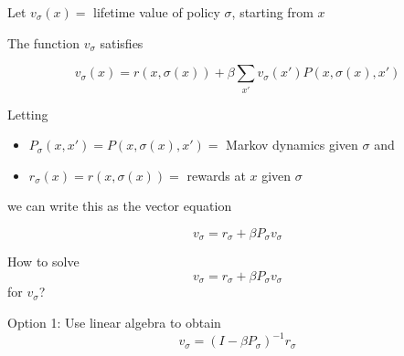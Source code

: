 \documentclass[xcolor=dvipsnames]{beamer}
\newcommand{\1}{\mathbbm 1}
\begin{document}
\begin{frame}

     Let $v_\sigma(x) =$ lifetime value of policy $\sigma$, starting from $x$

    \vspace{0.5em}
    The function $v_\sigma$ satisfies
    
    \begin{equation*}
        v_\sigma(x) = r(x, \sigma(x)) + \beta \sum_{x'} v_\sigma(x')P(x, \sigma(x), x')
    \end{equation*}

    Letting
    \begin{itemize}
        \item $P_\sigma(x, x') = P(x, \sigma(x), x') =$ Markov dynamics given
            $\sigma$ and
        \vspace{0.5em}
        \item $r_\sigma(x) = r(x, \sigma(x)) = $ rewards at $x$ given $\sigma$
    \end{itemize}

    we can write this as the vector equation

    \begin{equation*}
        v_\sigma = r_\sigma + \beta P_\sigma v_\sigma
    \end{equation*}


\end{frame}

\begin{frame}
    
    How to solve
    \begin{equation*}
        v_\sigma = r_\sigma + \beta P_\sigma v_\sigma
    \end{equation*}
    for $v_\sigma$?

        \vspace{0.5em}
        \vspace{0.5em}
    Option 1: Use linear algebra to obtain
    \begin{equation*}
        v_\sigma = (I - \beta P_\sigma)^{-1}  r_\sigma
    \end{equation*}

\end{frame}
\end{document}
